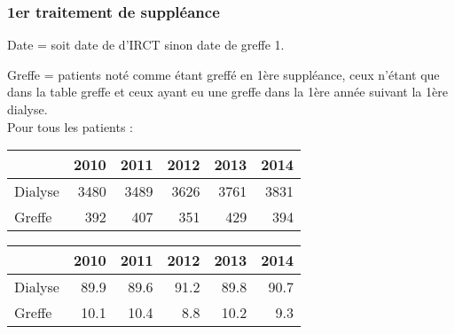 \documentclass[11pt,a4paper]{article}\usepackage[]{graphicx}\usepackage[]{color}
\begin{document}
% 
% 
% 
% 


    \subsubsection{1er traitement de suppléance}

Date = soit date de d'IRCT sinon date de greffe 1. 

Greffe = patients noté comme étant greffé en 1ère suppléance, ceux n'étant que dans la table greffe et ceux ayant eu une greffe dans la 1ère année suivant la 1ère dialyse.
~\\

Pour tous les patients :

\begin{table}[H]
\centering
\begin{tabular}{lrrrrr}
  \hline
 & 2010 & 2011 & 2012 & 2013 & 2014 \\ 
  \hline
Dialyse & 3480 & 3489 & 3626 & 3761 & 3831 \\ 
  Greffe & 392 & 407 & 351 & 429 & 394 \\ 
   \hline
\end{tabular}
\end{table}
\begin{table}[H]
\centering
\begin{tabular}{lrrrrr}
  \hline
 & 2010 & 2011 & 2012 & 2013 & 2014 \\ 
  \hline
Dialyse & 89.9 & 89.6 & 91.2 & 89.8 & 90.7 \\ 
  Greffe & 10.1 & 10.4 & 8.8 & 10.2 & 9.3 \\ 
   \hline
\end{tabular}
\end{table}
\end{document}
